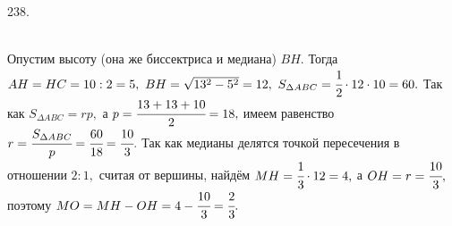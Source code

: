 238. \begin{figure}[ht!]
\end{figure}\\
Опустим высоту (она же биссектриса и медиана) $BH.$ Тогда $AH=HC=10:2=5,\ BH=\sqrt{13^2-5^2}=12,\ S_{\Delta ABC}=\cfrac{1}{2}\cdot12\cdot10=60.$ Так как $S_{\Delta ABC}=rp,$ а $p=\cfrac{13+13+10}{2}=18,$ имеем равенство $r=\cfrac{S_{\Delta ABC}}{p}=\cfrac{60}{18}=\cfrac{10}{3}.$ Так как медианы делятся точкой пересечения в отношении $2:1,$ считая от вершины, найдём $MH=\cfrac{1}{3}\cdot12=4,$ а $OH=r=\cfrac{10}{3},$ поэтому $MO=MH-OH=4-\cfrac{10}{3}=\cfrac{2}{3}.$\\
